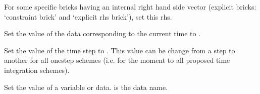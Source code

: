\documentclass[a4paper,11pt,english]{sphinxmanual}
\begin{document}
\begin{fulllineitems}
\begin{fulllineitems}
\end{fulllineitems}


\begin{fulllineitems}
\label{\detokenize{python/cmdref_Model:getfem.Model.set_private_rhs}}
For some specific bricks having an internal right hand side vector
(explicit bricks: ‘constraint brick’ and ‘explicit rhs brick’),
set this rhs.

\end{fulllineitems}


\begin{fulllineitems}
\label{\detokenize{python/cmdref_Model:getfem.Model.set_time}}
Set the value of the data  corresponding to the current time to .

\end{fulllineitems}


\begin{fulllineitems}
\label{\detokenize{python/cmdref_Model:getfem.Model.set_time_step}}
Set the value of the time step to . This value can be change
from a step to another for all one\sphinxhyphen{}step schemes (i.e. for the moment
to all proposed time integration schemes).

\end{fulllineitems}


\begin{fulllineitems}
\label{\detokenize{python/cmdref_Model:getfem.Model.set_variable}}
Set the value of a variable or data.  is the data name.


\end{fulllineitems}
\end{fulllineitems}
\end{document}
